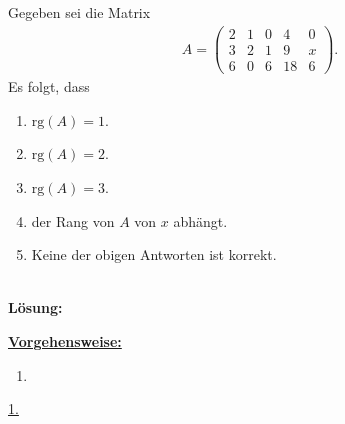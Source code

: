 \newpage

\subsection*{}
Gegeben sei die Matrix
\begin{align*}
	A =
	\begin{pmatrix}
		2 & 1 & 0 & 4 & 0 \\
		3 & 2 & 1 & 9 & x \\
		6 & 0 & 6 & 18 & 6 
	\end{pmatrix}.
\end{align*}
Es folgt, dass
\renewcommand{\labelenumi}{(\alph{enumi})}
\begin{enumerate}
	\item 
	$ \mathrm{rg}(A) = 1 $.
	\item 
	$ \mathrm{rg}(A) = 2 $.
	\item
	$ \mathrm{rg}(A) = 3 $.
	\item
	der Rang von $A$ von $x$ abhängt.
	\item
	Keine der obigen Antworten ist korrekt.
\end{enumerate}
\ \\
\textbf{Lösung:}
\begin{mdframed}
\underline{\textbf{Vorgehensweise:}}
\renewcommand{\labelenumi}{\theenumi.}
\begin{enumerate}
\item 
\end{enumerate}
\end{mdframed}

\underline{1. }\\



\newpage

